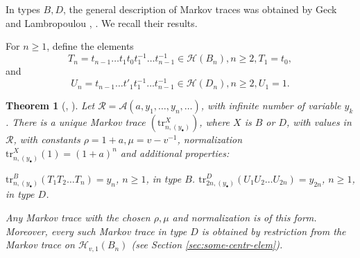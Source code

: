 \documentclass[11pt,leqno]{article}
\newtheorem{theorem}{Theorem}[subsection]
\theoremstyle{definition}
\theoremstyle{definition}
\theoremstyle{remark}
\newcommand{\He}{\mathcal{H}}
\newcommand{\tr}{\mathrm{tr}}
\begin{document}
In types $B, D$, the general description of Markov traces was obtained by Geck and Lambropoulou \cite{geckMarkovTracesKnot2004}, \cite{geckTraceFunctionsIwahoriHecke1998}. We recall their results.

For $n \geq 1$, define the elements
\[T_n = t_{n-1}\dots t_1 t_0 t_1^{-1}\dots t_{n-1}^{-1}\in \He(B_n), n \geq 2, T_1 = t_0,\]
and
\[U_n = t_{n-1}\dots t'_1 t_1^{-1}\dots t_{n-1}^{-1}\in \He(D_n), n \geq 2, U_1 = 1.\]

\begin{theorem}[\cite{geckMarkovTracesKnot2004}, \cite{geckTraceFunctionsIwahoriHecke1998}]
  \label{sec:gener-mark-trac-1}
 Let $\mathcal{R} = \mathcal{A}(a,y_1,\dots,y_n,\dots)$, with infinite number of variable $y_k$. There is a unique Markov trace $(\tr^X_{n,(y_{\bullet})})$, where $X$ is $B$ or $D$, with values in $\mathcal{R}$, with constants $\rho = 1 + a, \mu = v-v^{-1}$, normalization $\tr^{X}_{n,(y_\bullet)}(1) = (1+a)^n$ and additional properties:
  \begin{enumerate}
  \label{item:2} $\tr^{B}_{n,(y_{\bullet})}(T_1T_2 \dots T_n) = y_n$, $n \geq 1$, in type $B$.
  \label{item:7} $\tr^{D}_{2n,(y_{\bullet})}(U_1U_2 \dots U_{2n}) = y_{2n}$, $n \geq 1$, in type $D$.
  \end{enumerate}
Any Markov trace with the chosen $\rho, \mu$ and normalization is of this form.  Moreover, every such Markov trace in type $D$ is obtained by restriction from the Markov trace on $\He_{v,1}(B_n)$ (see Section \ref{sec:some-centr-elem}).
\end{theorem}
\end{document}

